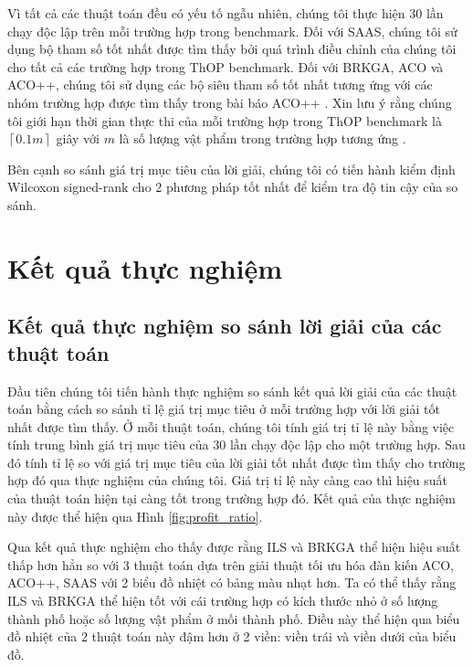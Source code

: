 Vì tất cả các thuật toán đều có yếu tố ngẫu nhiên, chúng tôi thực hiện 30 lần chạy độc lập trên mỗi trường hợp trong benchmark. Đối với SAAS, chúng tôi sử dụng bộ tham số tốt nhất được tìm thấy bởi quá trình điều chỉnh của chúng tôi cho tất cả các trường hợp trong ThOP benchmark. Đối với BRKGA, ACO và ACO++, chúng tôi sử dụng các bộ siêu tham số tốt nhất tương ứng với các nhóm trường hợp được tìm thấy trong bài báo ACO++ \cite{Chagas2021}. Xin lưu ý rằng chúng tôi giới hạn thời gian thực thi của mỗi trường hợp trong ThOP benchmark là $\left \lceil 0.1m \right \rceil$ giây với $m$ là số lượng vật phẩm trong trường hợp tương ứng \cite{8477853}.

Bên cạnh so sánh giá trị mục tiêu của lời giải, chúng tôi có tiến hành kiểm định Wilcoxon signed-rank cho 2 phương pháp tốt nhất để kiểm tra độ tin cậy của so sánh. 


\section{Kết quả thực nghiệm}
\label{sec:result}
\subsection{Kết quả thực nghiệm so sánh lời giải của các thuật toán}
\label{sec:solutionApproaches}

Đầu tiên chúng tôi tiến hành thực nghiệm so sánh kết quả lời giải của các thuật toán bằng cách so sánh tỉ lệ giá trị mục tiêu ở mỗi trường hợp với lời giải tốt nhất được tìm thấy. Ở mỗi thuật toán, chúng tôi tính giá trị tỉ lệ này bằng việc tính trung bình giá trị mục tiêu của 30 lần chạy độc lập cho một trường hợp. Sau đó tính tỉ lệ so với giá trị mục tiêu của lời giải tốt nhất được tìm thấy cho trường hợp đó qua thực nghiệm của chúng tôi. Giá trị tỉ lệ này càng cao thì hiệu suất của thuật toán hiện tại càng tốt trong trường hợp đó. Kết quả của thực nghiệm này được thể hiện qua Hình \ref{fig:profit_ratio}.

Qua kết quả thực nghiệm cho thấy được rằng ILS và BRKGA thể hiện hiệu suất thấp hơn hẳn so với 3 thuật toán dựa trên giải thuật tối ưu hóa đàn kiến ACO, ACO++, SAAS với 2 biểu đồ nhiệt có bảng màu nhạt hơn. Ta có thể thấy rằng ILS và BRKGA thể hiện tốt với cái trường hợp có kích thước nhỏ ở số lượng thành phố hoặc số lượng vật phẩm ở mối thành phố. Điều này thể hiện qua biểu đồ nhiệt của 2 thuật toán này đậm hơn ở 2 viền: viền trái và viền dưới của biểu đồ.

